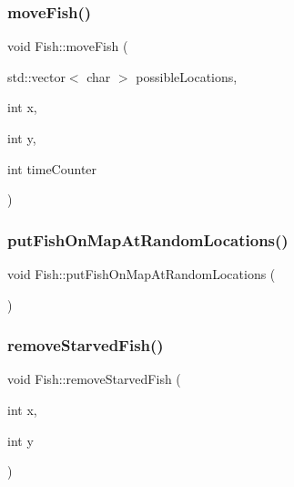 \mbox{\label{class_fish_a897b6f127f48eed86bdf9e76727e858b}} 
\subsubsection{\texorpdfstring{move\+Fish()}{moveFish()}}
{\footnotesize\ttfamily void Fish\+::move\+Fish (\begin{DoxyParamCaption}\item[{std\+::vector$<$ char $>$}]{possible\+Locations,  }\item[{int}]{x,  }\item[{int}]{y,  }\item[{int}]{time\+Counter }\end{DoxyParamCaption})}

\mbox{\label{class_fish_a834b0a13a75ea8fa873c88a175c89133}} 
\subsubsection{\texorpdfstring{put\+Fish\+On\+Map\+At\+Random\+Locations()}{putFishOnMapAtRandomLocations()}}
{\footnotesize\ttfamily void Fish\+::put\+Fish\+On\+Map\+At\+Random\+Locations (\begin{DoxyParamCaption}{ }\end{DoxyParamCaption})}

\mbox{\label{class_fish_a567bd1b821e032d36cdf81225452f57b}} 
\subsubsection{\texorpdfstring{remove\+Starved\+Fish()}{removeStarvedFish()}}
{\footnotesize\ttfamily void Fish\+::remove\+Starved\+Fish (\begin{DoxyParamCaption}\item[{int}]{x,  }\item[{int}]{y }\end{DoxyParamCaption})}



